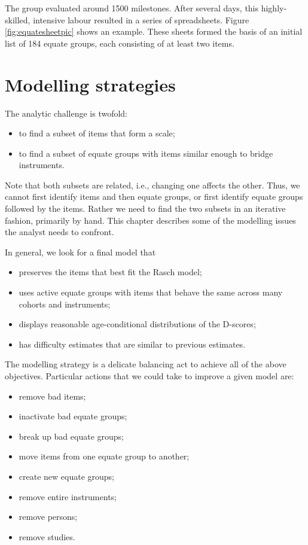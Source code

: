 \documentclass[
]{book}
\providecommand{\tightlist}{%
  \setlength{\itemsep}{0pt}\setlength{\parskip}{0pt}}
\begin{document}
The group evaluated around 1500 milestones. After several days, this highly-skilled, intensive labour resulted in a series of spreadsheets. Figure \ref{fig:equatesheetpic} shows an example. These sheets formed the basis of an initial list of 184 equate groups, each consisting of at least two items.

\hypertarget{sec:modellingstrategies}{%
\section{Modelling strategies}\label{sec:modellingstrategies}}

The analytic challenge is twofold:

\begin{itemize}
\tightlist
\item
  to find a subset of items that form a scale;
\item
  to find a subset of equate groups with items similar enough to bridge instruments.
\end{itemize}

Note that both subsets are related, i.e., changing one affects the other. Thus, we cannot first identify items and then equate groups, or first identify equate groups followed by the items. Rather we need to find the two subsets in an iterative fashion, primarily by hand. This chapter describes some of the modelling issues the analyst needs to confront.

In general, we look for a final model that

\begin{itemize}
\tightlist
\item
  preserves the items that best fit the Rasch model;
\item
  uses active equate groups with items that behave the same across many cohorts and instruments;
\item
  displays reasonable age-conditional distributions of the D-scores;
\item
  has difficulty estimates that are similar to previous estimates.
\end{itemize}

The modelling strategy is a delicate balancing act to achieve all of the above objectives. Particular actions that we could take to improve a given model are:

\begin{itemize}
\tightlist
\item
  remove bad items;
\item
  inactivate bad equate groups;
\item
  break up bad equate groups;
\item
  move items from one equate group to another;
\item
  create new equate groups;
\item
  remove entire instruments;
\item
  remove persons;
\item
  remove studies.
\end{itemize}
\end{document}
